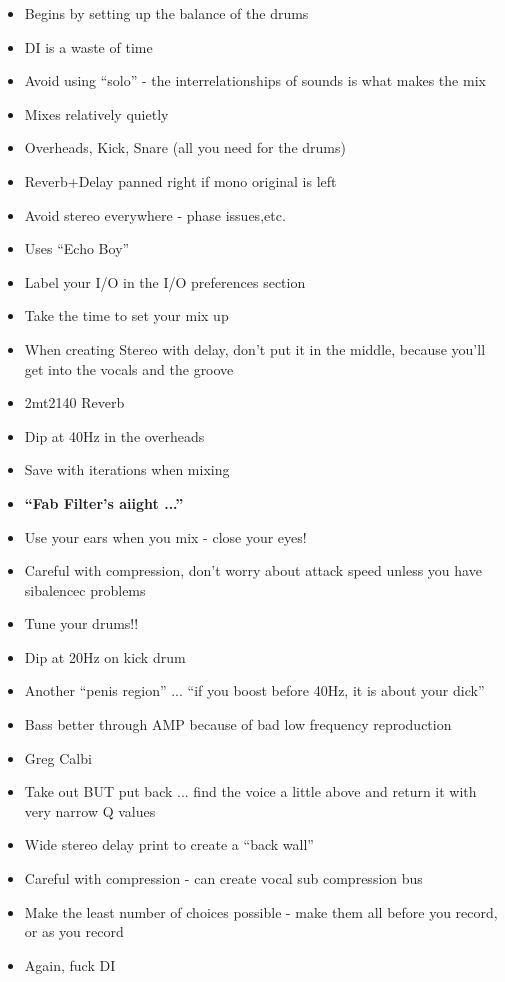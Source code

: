 \documentclass{article}
\begin{document}
\begin{itemize}
\item Begins by setting up the balance of the drums
\item DI is a waste of time
\item Avoid using ``solo'' - the interrelationships of sounds is what makes the mix
\item Mixes relatively quietly 
\item Overheads, Kick, Snare (all you need for the drums)
\item Reverb+Delay panned right if mono original is left 
\item Avoid stereo everywhere - phase issues,etc.
\item Uses ``Echo Boy''
\item Label your I/O in the I/O preferences section 
\item Take the time to set your mix up
\item When creating Stereo with delay, don't put it in the middle, because you'll get into the vocals and the groove
\item 2mt2140 Reverb
\item Dip at 40Hz in the overheads 
\item Save with iterations when mixing
\item \textbf{``Fab Filter's aiight ...''}
\item Use your ears when you mix - close your eyes!
\item Careful with compression, don't worry about attack speed unless you have sibalencec problems
\item Tune your drums!!
\item Dip at 20Hz on kick drum 
\item Another ``penis region'' ... ``if you boost before 40Hz, it is about your dick''
\item Bass better through AMP because of bad low frequency reproduction
\item Greg Calbi
\item Take out BUT put back ... find the voice a little above and return it with very narrow Q values
\item Wide stereo delay print to create a ``back wall''
\item Careful with compression - can create vocal sub compression bus
\item Make the least number of choices possible - make them all before you record, or as you record
\item Again, fuck DI
\end{itemize}
\end{document}
